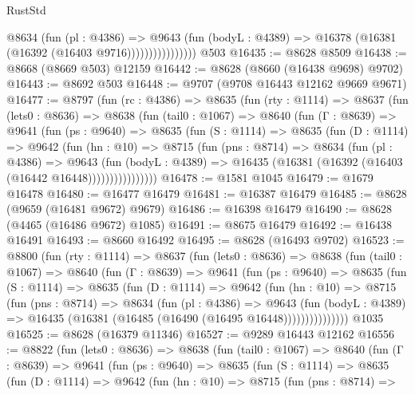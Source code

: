 \begin{lexlean}{RustStd}
\begin{coremodule}
                        @8634
                          (fun (pl : @4386) =>
                          @9643
                            (fun (bodyL : @4389) =>
                            @16378 (@16381 (@16392 (@16403 @9716))))))))))))))))
    @503
@16435 := @8628 @8509
@16438 := @8668 (@8669 @503) @12159
@16442 := @8628 (@8660 (@16438 @9698) @9702)
@16443 := @8692 @503
@16448 := @9707 (@9708 @16443 @12162 @9669 @9671)
@16477 := @8797
    (fun (rc : @4386) =>
    @8635
      (fun (rty : @1114) =>
      @8637
        (fun (lets0 : @8636) =>
        @8638
          (fun (tail0 : @1067) =>
          @8640
            (fun (Γ : @8639) =>
            @9641
              (fun (ps : @9640) =>
              @8635
                (fun (S : @1114) =>
                @8635
                  (fun (D : @1114) =>
                  @9642
                    (fun (hn : @10) =>
                    @8715
                      (fun (pns : @8714) =>
                      @8634
                        (fun (pl : @4386) =>
                        @9643
                          (fun (bodyL : @4389) =>
                          @16435 (@16381 (@16392 (@16403 (@16442 @16448))))))))))))))))
@16478 := @1581 @1045
@16479 := @1679 @16478
@16480 := @16477 @16479
@16481 := @16387 @16479
@16485 := @8628 (@9659 (@16481 @9672) @9679)
@16486 := @16398 @16479
@16490 := @8628 (@4465 (@16486 @9672) @1085)
@16491 := @8675 @16479
@16492 := @16438 @16491
@16493 := @8660 @16492
@16495 := @8628 (@16493 @9702)
@16523 := @8800
    (fun (rty : @1114) =>
    @8637
      (fun (lets0 : @8636) =>
      @8638
        (fun (tail0 : @1067) =>
        @8640
          (fun (Γ : @8639) =>
          @9641
            (fun (ps : @9640) =>
            @8635
              (fun (S : @1114) =>
              @8635
                (fun (D : @1114) =>
                @9642
                  (fun (hn : @10) =>
                  @8715
                    (fun (pns : @8714) =>
                    @8634
                      (fun (pl : @4386) =>
                      @9643
                        (fun (bodyL : @4389) =>
                        @16435 (@16381 (@16485 (@16490 (@16495 @16448)))))))))))))))
    @1035
@16525 := @8628 (@16379 @11346)
@16527 := @9289 @16443 @12162
@16556 := @8822
    (fun (lets0 : @8636) =>
    @8638
      (fun (tail0 : @1067) =>
      @8640
        (fun (Γ : @8639) =>
        @9641
          (fun (ps : @9640) =>
          @8635
            (fun (S : @1114) =>
            @8635
              (fun (D : @1114) =>
              @9642
                (fun (hn : @10) =>
                @8715
                  (fun (pns : @8714) =>

\end{coremodule}
\end{lexlean}
